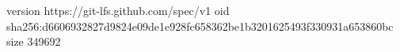 version https://git-lfs.github.com/spec/v1
oid sha256:d6606932827d9824e09de1e928fc658362be1b3201625493f330931a653860bc
size 349692
